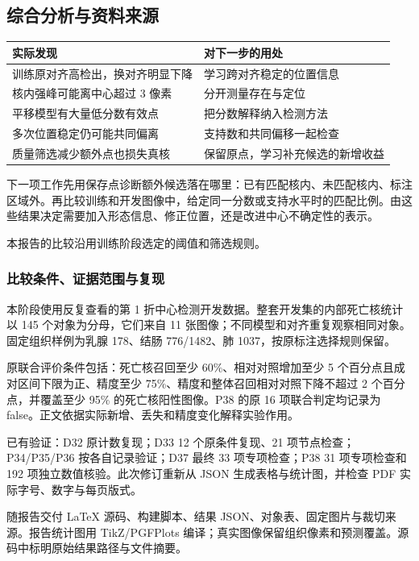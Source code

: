 \documentclass[
  12pt,
  fontset=fandol]{ctexart}
\newcounter{none} %
\begin{document}
\subsection{综合分析与资料来源}\label{chapter42}
{\def\LTcaptype{none}
\begin{longtable}[]{@{}
  >{\raggedright\arraybackslash}p{}
  >{\raggedright\arraybackslash}p{}@{}}
\toprule\noalign{}
实际发现 & 对下一步的用处\\
\midrule\noalign{}
\endhead
\bottomrule\noalign{}
\endlastfoot
训练原对齐高检出，换对齐明显下降 & 学习跨对齐稳定的位置信息\\
核内强峰可能离中心超过 3 像素 & 分开测量存在与定位\\
平移模型有大量低分数有效点 & 把分数解释纳入检测方法\\
多次位置稳定仍可能共同偏离 & 支持数和共同偏移一起检查\\
质量筛选减少额外点也损失真核 & 保留原点，学习补充候选的新增收益\\
\end{longtable}}
下一项工作先用保存点诊断额外候选落在哪里：已有匹配核内、未匹配核内、标注区域外。再比较训练和开发图像中，给定同一分数或支持水平时的匹配比例。由这些结果决定需要加入形态信息、修正位置，还是改进中心不确定性的表示。

本报告的比较沿用训练阶段选定的阈值和筛选规则。

\subsubsection{比较条件、证据范围与复现}\label{chapter43}
本阶段使用反复查看的第 1 折中心检测开发数据。整套开发集的内部死亡核统计以 145 个对象为分母，它们来自 11 张图像；不同模型和对齐重复观察相同对象。固定组织样例为乳腺 178、结肠 776/1482、肺 1037，按原标注选择规则保留。

原联合评价条件包括：死亡核召回至少 60\%、相对对照增加至少 5 个百分点且成对区间下限为正、精度至少 75\%、精度和整体召回相对对照下降不超过 2 个百分点，并覆盖至少 95\% 的死亡核阳性图像。P38 的原 16 项联合判定均记录为 false。正文依据实际新增、丢失和精度变化解释实验作用。

已有验证：D32 原计数复现；D33 12 个原条件复现、21 项节点检查；P34/P35/P36 按各自记录验证；D37 最终 33 项专项检查；P38 31 项专项检查和 192 项独立数值核验。此次修订重新从 JSON 生成表格与统计图，并检查 PDF 实际字号、数字与每页版式。

随报告交付 LaTeX 源码、构建脚本、结果 JSON、对象表、固定图片与裁切来源。报告统计图用 TikZ/PGFPlots 编译；真实图像保留组织像素和预测覆盖。源码中标明原始结果路径与文件摘要。
\end{document}
